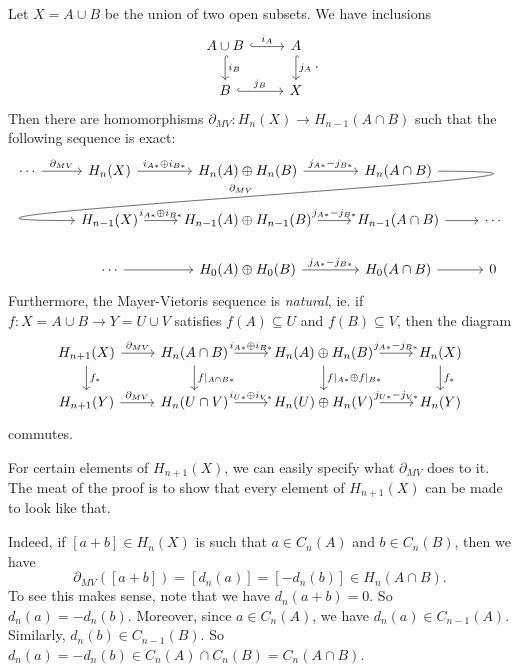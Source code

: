 \documentclass[a4paper]{article}
\begin{document}
\begin{thm}
  Let $X = A \cup B$ be the union of two open subsets. We have inclusions
  \[
    \begin{tikzcd}
      A \cup B \ar[r, "i_A", hook] \ar[d, "i_B", hook] & A \ar[d, hook, "j_A"]\\
      B \ar[r, hook, "j_B"] & X
    \end{tikzcd}.
  \]
  Then there are homomorphisms $\partial_{MV}: H_n(X) \to H_{n - 1}(A \cap B)$ such that the following sequence is exact:
  \[
    \begin{tikzcd}
      \cdots \ar[r, "\partial_{MV}"] & H_n(X) \ar[r, "i_{A*} \oplus i_{B*}"] & H_n(A) \oplus H_n(B) \ar[r, "j_{A*} - j_{B*}"] & H_n(A\cap B)\ar[out=0, in=180, looseness=2, overlay, lld, "\partial_{MV}"']\\
      & H_{n - 1}(X) \ar[r, "i_{A*} \oplus i_{B*}"] & H_{n - 1}(A) \oplus H_{n - 1}(B) \ar[r, "j_{A*} - j_{B*}"] & H_{n - 1}(A\cap B) \ar [r] & \cdots\\
      &\cdots \ar[r] & H_0(A) \oplus H_0(B) \ar[r, "j_{A*} - j_{B*}"] & H_0(A\cap B) \ar [r] & 0
    \end{tikzcd}
  \]
  Furthermore, the Mayer-Vietoris sequence is \emph{natural}, ie. if $f: X = A\cup B \to Y = U \cup V$ satisfies $f(A) \subseteq U$ and $f(B) \subseteq V$, then the diagram
  \[
    \begin{tikzcd}
       H_{n + 1}(X) \ar[r, "\partial_{MV}"] \ar[d, "f_*"] & H_{n}(A \cap B) \ar[r, "i_{A*} \oplus i_{B*}"] \ar[d, "f|_{A \cap B*}"] & H_n(A) \oplus H_n(B) \ar[r, "j_{A*} - j_{B*}"] \ar[d, "f|_{A*} \oplus f|_{B*}"] & H_n(X)  \ar[d, "f_*"]\\
       H_{n + 1}(Y) \ar[r, "\partial_{MV}"] & H_{n}(U \cap V) \ar[r, "i_{U*} \oplus i_{V*}"] & H_n(U) \oplus H_n(V) \ar[r, "j_{U*} - j_{V*}"] & H_n(Y)
    \end{tikzcd}
  \]
  commutes.
\end{thm}
For certain elements of $H_{n + 1}(X)$, we can easily specify what $\partial_{MV}$ does to it. The meat of the proof is to show that every element of $H_{n + 1}(X)$ can be made to look like that.

Indeed, if $[a + b] \in H_n(X)$ is such that $a \in C_n(A)$ and $b \in C_n(B)$, then we have
\[
  \partial_{MV}([a + b]) = [d_n(a)] = [-d_n(b)] \in H_n(A \cap B).
\]
To see this makes sense, note that we have $d_n(a + b) = 0$. So $d_n(a) = - d_n(b)$. Moreover, since $a \in C_n(A)$, we have $d_n(a) \in C_{n - 1}(A)$. Similarly, $d_n(b) \in C_{n - 1}(B)$. So $d_n(a) = - d_n(b) \in C_n(A) \cap C_n(B) = C_n(A \cap B)$.
\end{document}
